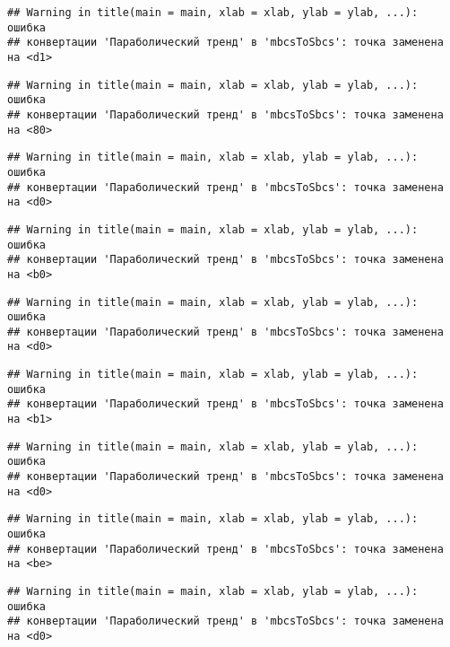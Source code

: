 \documentclass[
]{article}
\begin{document}
\begin{verbatim}
## Warning in title(main = main, xlab = xlab, ylab = ylab, ...): ошибка
## конвертации 'Параболический тренд' в 'mbcsToSbcs': точка заменена на <d1>
\end{verbatim}

\begin{verbatim}
## Warning in title(main = main, xlab = xlab, ylab = ylab, ...): ошибка
## конвертации 'Параболический тренд' в 'mbcsToSbcs': точка заменена на <80>
\end{verbatim}

\begin{verbatim}
## Warning in title(main = main, xlab = xlab, ylab = ylab, ...): ошибка
## конвертации 'Параболический тренд' в 'mbcsToSbcs': точка заменена на <d0>
\end{verbatim}

\begin{verbatim}
## Warning in title(main = main, xlab = xlab, ylab = ylab, ...): ошибка
## конвертации 'Параболический тренд' в 'mbcsToSbcs': точка заменена на <b0>
\end{verbatim}

\begin{verbatim}
## Warning in title(main = main, xlab = xlab, ylab = ylab, ...): ошибка
## конвертации 'Параболический тренд' в 'mbcsToSbcs': точка заменена на <d0>
\end{verbatim}

\begin{verbatim}
## Warning in title(main = main, xlab = xlab, ylab = ylab, ...): ошибка
## конвертации 'Параболический тренд' в 'mbcsToSbcs': точка заменена на <b1>
\end{verbatim}

\begin{verbatim}
## Warning in title(main = main, xlab = xlab, ylab = ylab, ...): ошибка
## конвертации 'Параболический тренд' в 'mbcsToSbcs': точка заменена на <d0>
\end{verbatim}

\begin{verbatim}
## Warning in title(main = main, xlab = xlab, ylab = ylab, ...): ошибка
## конвертации 'Параболический тренд' в 'mbcsToSbcs': точка заменена на <be>
\end{verbatim}

\begin{verbatim}
## Warning in title(main = main, xlab = xlab, ylab = ylab, ...): ошибка
## конвертации 'Параболический тренд' в 'mbcsToSbcs': точка заменена на <d0>
\end{verbatim}
\end{document}
